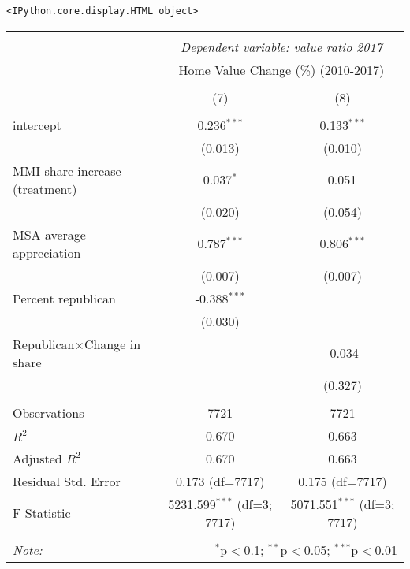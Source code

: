 \documentclass[11pt]{article}
\makeatletter
\newcommand{\boxspacing}{\kern\kvtcb@left@rule\kern\kvtcb@boxsep}
\newcommand{\prompt}[4]{
        {\ttfamily\llap{{\color{#2}[#3]:\hspace{3pt}#4}}\vspace{-\baselineskip}}
    }
\makeatother
\begin{document}
            \begin{tcolorbox}[breakable, size=fbox, boxrule=.5pt, pad at break*=1mm, opacityfill=0]
\prompt{Out}{outcolor}{40}{\boxspacing}
\begin{Verbatim}[commandchars=\\\{\}]
<IPython.core.display.HTML object>
\end{Verbatim}
\end{tcolorbox}
\begin{table}[!htbp] \centering
    \begin{tabular}{@{\extracolsep{5pt}}lcc}
    \\[-1.8ex]\hline
    \hline \\[-1.8ex]
    & \multicolumn{2}{c}{\textit{Dependent variable: value ratio 2017}} \
    \cr \cline{2-3}
    \\[-1.8ex] & \multicolumn{2}{c}{Home Value Change (\%) (2010-2017)}  \\
    \\[-1.8ex] & (7) & (8) \\
    \hline \\[-1.8ex]
    intercept & 0.236$^{***}$ & 0.133$^{***}$ \\
    & (0.013) & (0.010) \\
     MMI-share increase (treatment) & 0.037$^{*}$ & 0.051$^{}$ \\
    & (0.020) & (0.054) \\
     MSA average appreciation & 0.787$^{***}$ & 0.806$^{***}$ \\
    & (0.007) & (0.007) \\
     Percent republican & -0.388$^{***}$ & \\
    & (0.030) & \\
     Republican$\times$Change in share & & -0.034$^{}$ \\
    & & (0.327) \\
    \hline \\[-1.8ex]
     Observations & 7721 & 7721 \\
     $R^2$ & 0.670 & 0.663 \\
     Adjusted $R^2$ & 0.670 & 0.663 \\
     Residual Std. Error & 0.173 (df=7717) & 0.175 (df=7717) \\
     F Statistic & 5231.599$^{***}$ (df=3; 7717) & 5071.551$^{***}$ (df=3; 7717) \\
    \hline
    \hline \\[-1.8ex]
    \textit{Note:} & \multicolumn{2}{r}{$^{*}$p$<$0.1; $^{**}$p$<$0.05; $^{***}$p$<$0.01} \\
    \end{tabular}
    \end{table}
    
\end{document}
